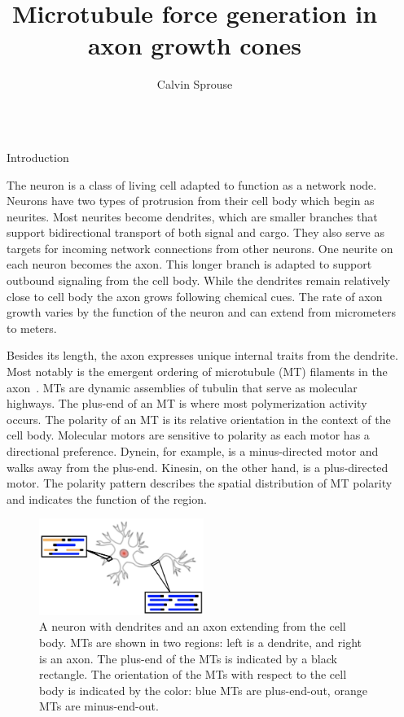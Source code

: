 \documentclass{beamer}
\title{Microtubule force generation in axon growth cones}
\author{Calvin Sprouse}
\institute[CWU]{Department of Physics, Central Washington University}
\newlength{\sepwidth}
\newlength{\colwidth}
\newcommand{\separatorcolumn}{\begin{column}{\sepwidth}\end{column}}
\begin{document}
\begin{frame}[t]
\begin{columns}[t]
\separatorcolumn%


\begin{column}{\colwidth}

\begin{block}{Introduction}

The neuron is a class of living cell adapted to function as a network node. Neurons have two types of protrusion from their cell body which begin as neurites. Most neurites become dendrites, which are smaller branches that support bidirectional transport of both signal and cargo. They also serve as targets for incoming network connections from other neurons. One neurite on each neuron becomes the axon. This longer branch is adapted to support outbound signaling from the cell body. While the dendrites remain relatively close to cell body the axon grows following chemical cues. The rate of axon growth varies by the function of the neuron and can extend from micrometers to meters.

Besides its length, the axon expresses unique internal traits from the dendrite. Most notably is the emergent ordering of microtubule (MT) filaments in the axon~\cite{nedelec1997n13}. MTs are dynamic assemblies of tubulin that serve as molecular highways. The plus-end of an MT is where most polymerization activity occurs. The polarity of an MT is its relative orientation in the context of the cell body. Molecular motors are sensitive to polarity as each motor has a directional preference. Dynein, for example, is a minus-directed motor and walks away from the plus-end. Kinesin, on the other hand, is a plus-directed motor. The polarity pattern describes the spatial distribution of MT polarity and indicates the function of the region.

\begin{figure}
    \centering
    \includegraphics[width=0.5\textwidth]{figures/background/neuron_with_mts.png}
    \caption{\label{fig:neuron_background}
        A neuron with dendrites and an axon extending from the cell body. MTs are shown in two regions: left is a dendrite, and right is an axon. The plus-end of the MTs is indicated by a black rectangle. The orientation of the MTs with respect to the cell body is indicated by the color: blue MTs are plus-end-out, orange MTs are minus-end-out.}
\end{figure}


\end{block}
\end{column}
\end{columns}
\end{frame}
\end{document}
